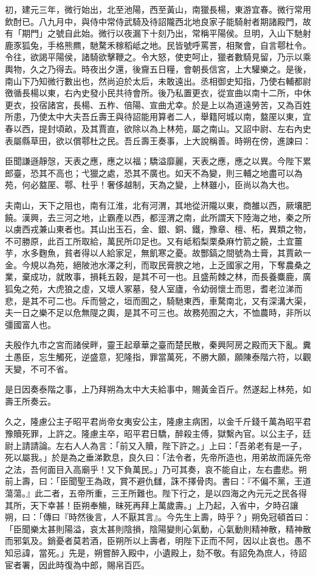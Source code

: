 \begin{pinyinscope}
初，建元三年，微行始出，北至池陽，西至黃山，南獵長楊，東游宜春。微行常用飲酎已。八九月中，與侍中常侍武騎及待詔隴西北地良家子能騎射者期諸殿門，故有「期門」之號自此始。微行以夜漏下十刻乃出，常稱平陽侯。旦明，入山下馳射鹿豕狐兔，手格熊羆，馳騖禾稼稻岻之地。民皆號呼罵詈，相聚會，自言鄠杜令。令往，欲謁平陽侯，諸騎欲擊鞭之。令大怒，使吏呵止，獵者數騎見留，乃示以乘輿物，久之乃得去。時夜出夕還，後齎五日糧，會朝長信宮，上大驩樂之。是後，南山下乃知微行數出也，然尚迫於太后，未敢遠出。丞相御史知指，乃使右輔都尉徼循長楊以東，右內史發小民共待會所。後乃私置更衣，從宣曲以南十二所，中休更衣，投宿諸宮，長楊、五柞、倍陽、宣曲尤幸。於是上以為道遠勞苦，又為百姓所患，乃使太中大夫吾丘壽王與待詔能用算者二人，舉籍阿城以南，盩厔以東，宜春以西，提封頃畝，及其賈直，欲除以為上林苑，屬之南山。又詔中尉、左右內史表屬縣草田，欲以償鄠杜之民。吾丘壽王奏事，上大說稱善。時朔在傍，進諫曰：

臣聞謙遜靜愨，天表之應，應之以福；驕溢靡麗，天表之應，應之以異。今陛下累郎臺，恐其不高也；弋獵之處，恐其不廣也。如天不為變，則三輔之地盡可以為苑，何必盩厔、鄠、杜乎！奢侈越制，天為之變，上林雖小，臣尚以為大也。

夫南山，天下之阻也，南有江淮，北有河渭，其地從汧隴以東，商雒以西，厥壤肥饒。漢興，去三河之地，止霸產以西，都涇渭之南，此所謂天下陸海之地，秦之所以虜西戎兼山東者也。其山出玉石，金、銀、銅、鐵，豫章、檀、柘，異類之物，不可勝原，此百工所取給，萬民所卬足也。又有岻稻梨栗桑麻竹箭之饒，土宜薑芋，水多麴魚，貧者得以人給家足，無飢寒之憂。故酆鎬之間號為土膏，其賈畝一金。今規以為苑，絕陂池水澤之利，而取民膏腴之地，上乏國家之用，下奪農桑之業，棄成功，就敗事，損耗五穀，是其不可一也。且盛荊棘之林，而長養麋鹿，廣狐兔之苑，大虎狼之虛，又壞人冢墓，發人室廬，令幼弱懷土而思，耆老泣涕而悲，是其不可二也。斥而營之，垣而囿之，騎馳東西，車騖南北，又有深溝大渠，夫一日之樂不足以危無隄之輿，是其不可三也。故務苑囿之大，不恤農時，非所以彊國富人也。

夫殷作九巿之宮而諸侯畔，靈王起章華之臺而楚民散，秦興阿房之殿而天下亂。糞土愚臣，忘生觸死，逆盛意，犯隆指，罪當萬死，不勝大願，願陳泰階六符，以觀天變，不可不省。

是日因奏泰階之事，上乃拜朔為太中大夫給事中，賜黃金百斤。然遂起上林苑，如壽王所奏云。

久之，隆慮公主子昭平君尚帝女夷安公主，隆慮主病困，以金千斤錢千萬為昭平君豫贖死罪，上許之。隆慮主卒，昭平君日驕，醉殺主傅，獄繫內官。以公主子，廷尉上請請論。左右人人為言：「前又入贖，陛下許之。」上曰：「吾弟老有是一子，死以屬我。」於是為之垂涕歎息，良久曰：「法令者，先帝所造也，用弟故而誣先帝之法，吾何面目入高廟乎！又下負萬民。」乃可其奏，哀不能自止，左右盡悲。朔前上壽，曰：「臣聞聖王為政，賞不避仇讎，誅不擇骨肉。書曰：『不偏不黨，王道蕩蕩。』此二者，五帝所重，三王所難也。陛下行之，是以四海之內元元之民各得其所，天下幸甚！臣朔奉觴，昧死再拜上萬歲壽。」上乃起，入省中，夕時召讓朔，曰：「傳曰『時然後言，人不厭其言』。今先生上壽，時乎？」朔免冠頓首曰：「臣聞樂太甚則陽溢，哀太甚則陰損，陰陽變則心氣動，心氣動則精神散，精神散而邪氣及。銷憂者莫若酒，臣朔所以上壽者，明陛下正而不阿，因以止哀也。愚不知忌諱，當死。」先是，朔嘗醉入殿中，小遺殿上，劾不敬。有詔免為庶人，待詔宦者署，因此時復為中郎，賜帛百匹。


\end{pinyinscope}
